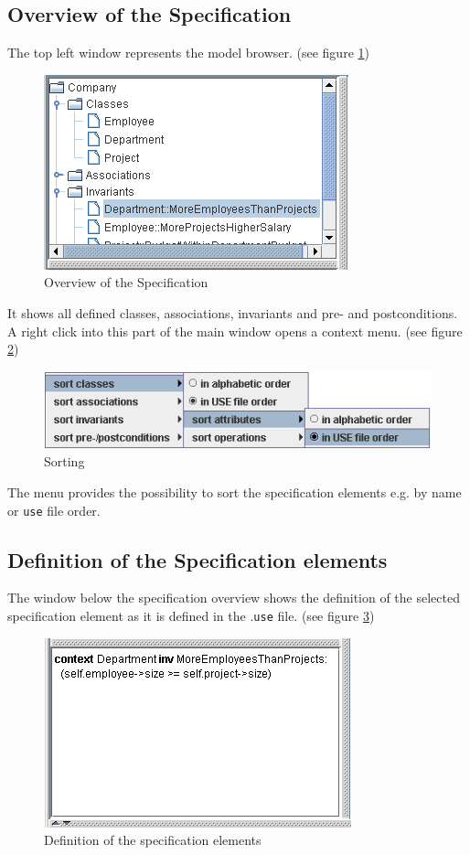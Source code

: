 \documentclass[a4paper,titlepage,oneside,final]{scrreprt} %
\begin{document}
\subsection{Overview of the Specification}\label{specificationOverview}
The top left window represents the model browser. (see figure \ref{fig:OverviewOfSpec})
\begin{figure}[ht]
\centering
\includegraphics[scale=0.7]{Screenshots/GUI/Views/OverviewOfSpec.png}
\caption{Overview of the Specification}
\label{fig:OverviewOfSpec}
\end{figure}
It shows all defined classes,
associations, invariants and pre- and postconditions.
A right click into this part of the main window opens a context menu.
(see figure \ref{fig:OverviewOfSpecSort})
\begin{figure}[ht]
\centering
\includegraphics[scale=0.7]{Screenshots/GUI/Views/OverviewOfSpecSort.png}
\caption{Sorting}
\label{fig:OverviewOfSpecSort}
\end{figure}
The menu provides
the possibility to sort the specification elements e.g.
by name or \verb+use+ file order.
\subsection{Definition of the Specification elements}\label{low}
The window below the specification overview shows the definition of the
selected specification element as it is defined
in the .\verb+use+ file. (see figure \ref{fig:DefinitionOfSpec})
\begin{figure}[ht]
\centering
\includegraphics[scale=0.7]{Screenshots/GUI/Views/DefinitionOfSpec.png}
\caption{Definition of the specification elements}
\label{fig:DefinitionOfSpec}
\end{figure}
\end{document}
